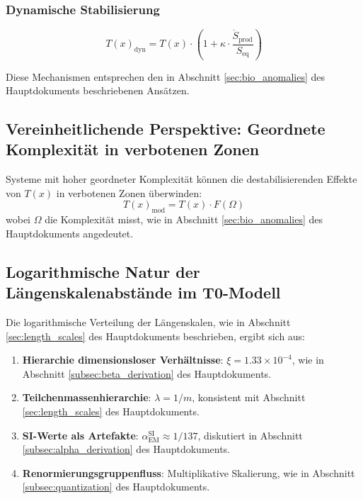 \documentclass[12pt,a4paper]{article}
\newcommand{\Tfield}{T(x)}
\newcommand{\alphaEM}{\alpha_{\text{EM}}}
\begin{document}
	\subsubsection{Dynamische Stabilisierung}
	\label{subsubsec:dyn_stabilisierung}
	
	\begin{equation}
		\Tfield_{\text{dyn}} = \Tfield \cdot \left(1 + \kappa \cdot \frac{\dot{S}_{\text{prod}}}{S_{\text{eq}}}\right)
	\end{equation}
	
	Diese Mechanismen entsprechen den in Abschnitt \ref{sec:bio_anomalies} des Hauptdokuments beschriebenen Ansätzen.
	
	\subsection{Vereinheitlichende Perspektive: Geordnete Komplexität in verbotenen Zonen}
	\label{subsec:geordnete_komplexitaet}
	
	\begin{tcolorbox}[colback=blue!5!white,colframe=blue!75!black,title=Prinzip der geordneten Komplexität in verbotenen Zonen]
		Systeme mit hoher geordneter Komplexität können die destabilisierenden Effekte von \(\Tfield\) in verbotenen Zonen überwinden:
		\begin{equation}
			\Tfield_{\text{mod}} = \Tfield \cdot F(\Omega)
		\end{equation}
		wobei \(\Omega\) die Komplexität misst, wie in Abschnitt \ref{sec:bio_anomalies} des Hauptdokuments angedeutet.
	\end{tcolorbox}
	
	\subsection{Logarithmische Natur der Längenskalenabstände im T0-Modell}
	\label{subsec:logarithmische_natur}
	
	Die logarithmische Verteilung der Längenskalen, wie in Abschnitt \ref{sec:length_scales} des Hauptdokuments beschrieben, ergibt sich aus:
	
	\begin{enumerate}
		\item \textbf{Hierarchie dimensionsloser Verhältnisse}: \(\xi = 1.33 \times 10^{-4}\), wie in Abschnitt \ref{subsec:beta_derivation} des Hauptdokuments.
		\item \textbf{Teilchenmassenhierarchie}: \(\lambda = 1/m\), konsistent mit Abschnitt \ref{sec:length_scales} des Hauptdokuments.
		\item \textbf{SI-Werte als Artefakte}: \(\alphaEM^{\text{SI}} \approx 1/137\), diskutiert in Abschnitt \ref{subsec:alpha_derivation} des Hauptdokuments.
		\item \textbf{Renormierungsgruppenfluss}: Multiplikative Skalierung, wie in Abschnitt \ref{subsec:quantization} des Hauptdokuments.
	\end{enumerate}
	
\end{document}
